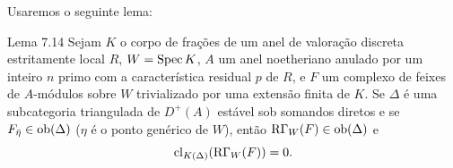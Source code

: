 Usaremos o seguinte lema:

\begin{statement}{Lema 7.14}
Sejam $K$ o corpo de frações de um anel de valoração discreta estritamente local $R$, $W=\operatorname{Spec} K$, $A$ um anel noetheriano anulado por um inteiro $n$ primo com a característica residual $p$ de $R$, e $F$ um complexo de feixes de $A$-módulos sobre $W$ trivializado por uma extensão finita de $K$. Se $\Delta$ é uma subcategoria triangulada de $D^+(A)$ estável sob somandos diretos e se $F_{\bar\eta}\in\operatorname{ob}(\Delta)$ ($\eta$ é o ponto genérico de $W$), então $\mathrm{R}\Gamma_W(F)\in\operatorname{ob}(\Delta)$ e
\[
\operatorname{cl}_{K(\Delta)}(\mathrm{R}\Gamma_W(F))=0.
\]
\end{statement}
